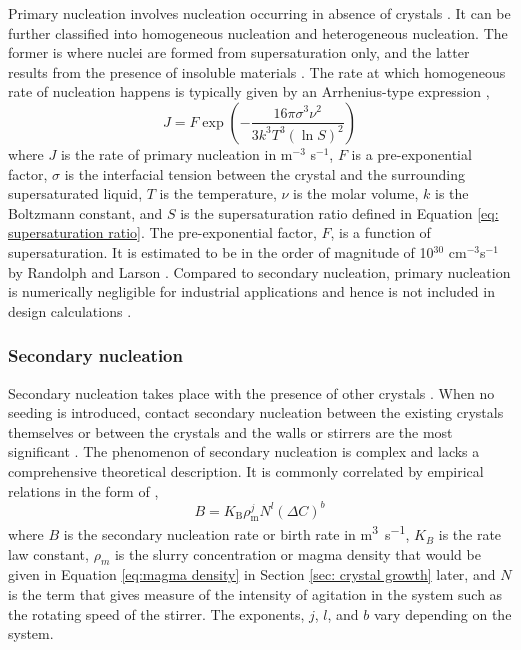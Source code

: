 Primary nucleation involves nucleation occurring in absence of crystals \cite{seader_separation_2011}. It can be further classified into homogeneous nucleation and heterogeneous nucleation. The former is where nuclei are formed from supersaturation only, and the latter results from the presence of insoluble materials \cite{richardson_chemical_2006}. The rate at which homogeneous rate of nucleation happens is typically given by an Arrhenius-type expression \cite{richardson_chemical_2006},
\begin{equation}
     J = F\exp\left(-\frac{16 \pi \sigma^3 \nu^2}{3 k^3 T^3 (\ln S)^2}\right)
\end{equation}
where $J$ is the rate of primary nucleation in m$^{-3}$ s$^{-1}$, $F$ is a pre-exponential factor, $\sigma$ is the interfacial tension between the crystal and the surrounding supersaturated liquid, $T$ is the temperature, $\nu$ is the molar volume, $k$ is the Boltzmann constant, and $S$ is the supersaturation ratio defined in Equation \ref{eq: supersaturation ratio}. The pre-exponential factor, $F$, is a function of supersaturation. It is estimated to be in the order of magnitude of 10$^{30}$ cm$^{-3}$s$^{-1}$ by Randolph and Larson \cite{randolph_theory_1971}. Compared to secondary nucleation, primary nucleation is numerically negligible for industrial applications and hence is not included in design calculations \cite{randolph_theory_1971}. 

\subsubsection{Secondary nucleation}\label{sec:secondary nucleation}

Secondary nucleation takes place with the presence of other crystals \cite{richardson_chemical_2006}. When no seeding is introduced, contact secondary nucleation between the existing crystals themselves or between the crystals and the walls or stirrers are the most significant \cite{richardson_chemical_2006}. The phenomenon of secondary nucleation is complex and lacks a comprehensive theoretical description. It is commonly correlated by empirical relations in the form of \cite{seader_separation_2011},
\begin{equation} \label{eq:secondary nucleation general}
    B = K_{\mathrm{B}} \rho^j_{\mathrm{m}} N^l (\Delta C)^b 
\end{equation}
where $B$ is the secondary nucleation rate or birth rate in \si{\cubic\m\per\s}, $K_B$ is the rate law constant, $\rho_m$ is the slurry concentration or magma density that would be given in Equation \ref{eq:magma density} in Section \ref{sec: crystal growth} later, and $N$ is the term that gives measure of the intensity of agitation in the system such as the rotating speed of the stirrer. The exponents, $j$, $l$, and $b$ vary depending on the system.

